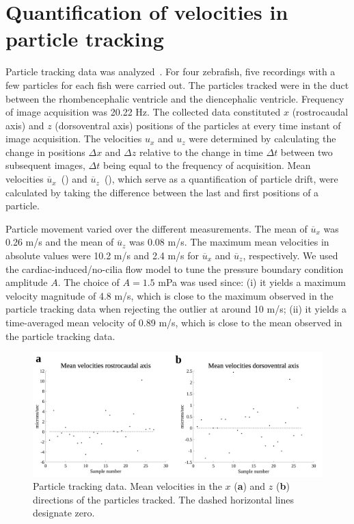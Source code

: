 \documentclass{WileyMSP-template}
\begin{document}
\section{Quantification of velocities in particle tracking}\label{sec:appC_particle_transport}
Particle tracking data was analyzed~\cite{Olstad2019CiliaryDevelopment}.
For four zebrafish, five recordings with a few particles for each fish were carried out.
The particles tracked were in the duct between the rhombencephalic ventricle and the
diencephalic ventricle. Frequency of image acquisition was 20.22 Hz.
The collected data constituted $x$ (rostrocaudal axis) and $z$ (dorsoventral axis) positions of the particles at every time
instant of image acquisition. The velocities $u_x$ and $u_z$ were determined by
calculating the change in positions $\Delta x$ and $\Delta z$ relative to the change
in time $\Delta t$ between two subsequent images, $\Delta t$ being equal to the
frequency of acquisition.
Mean velocities $\overline{u}_x$~() and
$\overline{u}_z$~(),
which serve as a quantification of particle drift, were calculated
by taking the difference between the last and first positions of a particle.

Particle movement varied over the different measurements. The mean of $\overline{u}_x$ was
0.26 \textmu m/s and the mean of $\overline{u}_z$ was 0.08 \textmu m/s.
The maximum mean velocities
in absolute values were 10.2 \textmu m/s and 2.4 \textmu m/s for
$\overline{u}_x$ and $\overline{u}_z$,
respectively. We used the cardiac-induced/no-cilia flow model to tune the
pressure boundary condition
amplitude $A$. The choice of $A=1.5$ mPa was used since: (i) it yields a
maximum velocity magnitude
of 4.8 \textmu m/s, which is close to the maximum observed in the
particle tracking data when
rejecting the outlier at around 10 \textmu m/s; (ii) it yields a time-averaged mean velocity
of 0.89 \textmu m/s, which is close to the mean observed in the particle tracking data.
\begin{figure}[H]
    \centering
    \includegraphics[width=\textwidth]{graphics/figure7.png}
    \caption{Particle tracking data. Mean velocities in
    the $x$ (\textbf{a}) and $z$ (\textbf{b})
    directions of the particles tracked.
    The dashed horizontal lines designate zero.}\label{fig:particle_tracking_data}
\end{figure}
\end{document}
